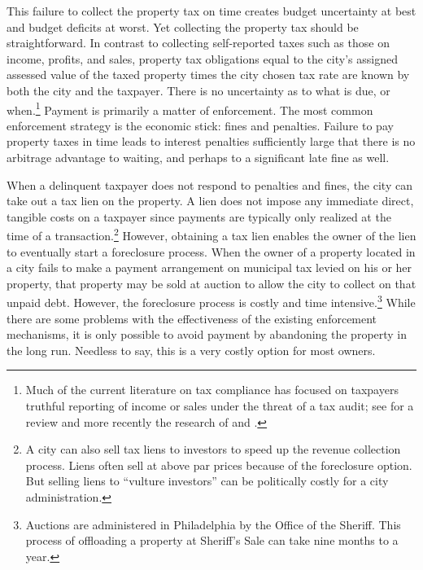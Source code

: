 This failure to collect the property tax on time creates budget
uncertainty at best and budget deficits at worst.  Yet collecting the
property tax should be straightforward.  In contrast to collecting
self-reported taxes such as those on income, profits, and sales,
property tax obligations equal to the city's assigned assessed value
of the taxed property times the city chosen tax rate are known by both
the city and the taxpayer.  There is no uncertainty as to what is due,
or when.\footnote{Much of the current literature on tax compliance has
  focused on taxpayers truthful reporting of income or sales under the
  threat of a tax audit; see \cite{Slemrod-07} for a review and more
  recently the research of \cite{Kleven-11} and \cite{Pomeranz-15}.}
Payment is primarily a matter of enforcement.  The most common
enforcement strategy is the economic stick: fines and penalties.
Failure to pay property taxes in time leads to interest penalties
sufficiently large that there is no arbitrage advantage to waiting,
and perhaps to a significant late fine as well.

When a delinquent taxpayer does not respond to penalties and fines,
the city can take out a tax lien on the property.  A lien does not
impose any immediate direct, tangible costs on a  taxpayer
since payments are typically only realized at the time of a
transaction.\footnote{A city can also sell tax liens to investors to
  speed up the revenue collection process. Liens often sell at above
  par prices because of the foreclosure option. But selling liens to
  ``vulture investors'' can be politically costly for a city
  administration.}  However, obtaining a tax lien enables the owner of
the lien to eventually start a foreclosure process. When the owner of
a property located in a city fails to make a payment arrangement on
municipal tax levied on his or her property, that property may be
sold at auction to allow the city to collect on that unpaid debt.
However, the foreclosure process is costly and time
intensive.\footnote{Auctions are administered in Philadelphia by the
  Office of the Sheriff.  This process of offloading a property at
  Sheriff's Sale can take nine months to a year.}  While there are
some problems with the effectiveness of the existing enforcement
mechanisms, it is only possible to avoid payment by abandoning the
property in the long run. Needless to say, this is a very costly
option for most owners.

